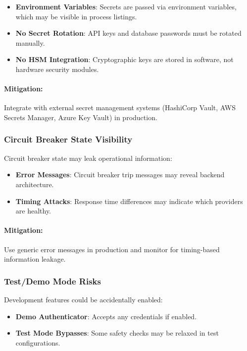 \begin{itemize}
    \item \textbf{Environment Variables}: Secrets are passed via environment variables, which may be visible in process listings.
    \item \textbf{No Secret Rotation}: API keys and database passwords must be rotated manually.
    \item \textbf{No HSM Integration}: Cryptographic keys are stored in software, not hardware security modules.
\end{itemize}

\paragraph{Mitigation:} Integrate with external secret management systems (HashiCorp Vault, AWS Secrets Manager, Azure Key Vault) in production.

\subsubsection{Circuit Breaker State Visibility}

Circuit breaker state may leak operational information:

\begin{itemize}
    \item \textbf{Error Messages}: Circuit breaker trip messages may reveal backend architecture.
    \item \textbf{Timing Attacks}: Response time differences may indicate which providers are healthy.
\end{itemize}

\paragraph{Mitigation:} Use generic error messages in production and monitor for timing-based information leakage.

\subsubsection{Test/Demo Mode Risks}

Development features could be accidentally enabled:

\begin{itemize}
    \item \textbf{Demo Authenticator}: Accepts any credentials if enabled.
    \item \textbf{Test Mode Bypasses}: Some safety checks may be relaxed in test configurations.
\end{itemize}

